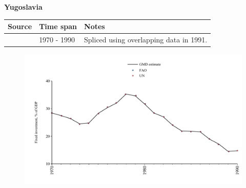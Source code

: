\documentclass[12pt,a4paper,landscape]{article}
\begin{document}
\begin{adjustbox}{max totalsize={\paperwidth}{\paperheight},center}
\begin{minipage}[t][\textheight][t]{\textwidth}
\vspace*{0.5cm}
{}
\begin{center}
{\Large\bfseries Yugoslavia}
\end{center}
\vspace{0.5cm}
\begin{table}[H]
\centering
\small
\begin{tabular}{|l|l|l|}
\hline
\textbf{Source} & \textbf{Time span} & \textbf{Notes} \\
\hline
\rowcolor{white}\cite{UN}& 1970 - 1990 &Spliced using overlapping data in 1991.\\
\hline
\end{tabular}
\end{table}
\begin{figure}[H]
\centering
\includegraphics[width=\textwidth,height=0.6\textheight,keepaspectratio]{graphs/YUG_finv_GDP.pdf}
\end{figure}
\end{minipage}
\end{adjustbox}
\end{document}
